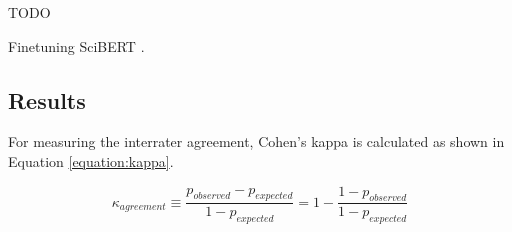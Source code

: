 TODO

Finetuning SciBERT \cite{jurafsky2019speech}.

\subsection{Results}

For measuring the interrater agreement, Cohen's kappa \cite{cohen1960coefficient} is calculated as shown in Equation \ref{equation:kappa}.

\begin{equation} \label{equation:kappa}
\kappa_{agreement} \equiv \frac{p_{observed} - p_{expected}}{1 - p_{expected}} = 1 - \frac{1 - p_{observed}}{1 - p_{expected}}
\end{equation}
